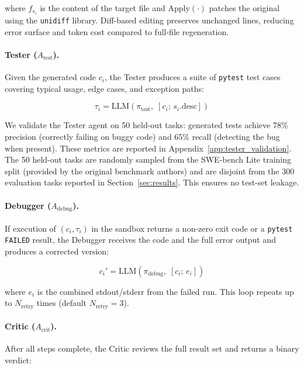 \documentclass[journal]{IEEEtran}
\begin{document}
\noindent where $f_{s_i}$ is the content of the target file and $\text{Apply}(\cdot)$ patches the original using the \texttt{unidiff} library. Diff-based editing preserves unchanged lines, reducing error surface and token cost compared to full-file regeneration.

\paragraph{Tester ($A_\text{test}$).}
Given the generated code $c_i$, the Tester produces a suite of \texttt{pytest} test cases covering typical usage, edge cases, and exception paths:

\begin{equation}
  \tau_i = \text{LLM}(\pi_\text{test},\;
           [c_i;\, s_i.\text{desc}])
\end{equation}

We validate the Tester agent on 50 held-out tasks: generated tests achieve 78\% precision (correctly failing on buggy code) and 65\% recall (detecting the bug when present). These metrics are reported in Appendix~\ref{app:tester_validation}. The 50 held-out tasks are randomly sampled from the SWE-bench Lite training split (provided by the original benchmark authors) and are disjoint from the 300 evaluation tasks reported in Section~\ref{sec:results}. This ensures no test-set leakage.

\paragraph{Debugger ($A_\text{debug}$).}
If execution of $(c_i, \tau_i)$ in the sandbox returns a non-zero exit code or a \texttt{pytest} \texttt{FAILED} result, the Debugger receives the code and the full error output and produces a corrected version:

\begin{equation}
  c_i' = \text{LLM}(\pi_\text{debug},\; [c_i;\, e_i])
\end{equation}

\noindent where $e_i$ is the combined stdout/stderr from the failed run. This loop repeats up to $N_\text{retry}$ times (default $N_\text{retry} = 3$).

\paragraph{Critic ($A_\text{crit}$).}
After all steps complete, the Critic reviews the full result set and returns a binary verdict:
\end{document}
